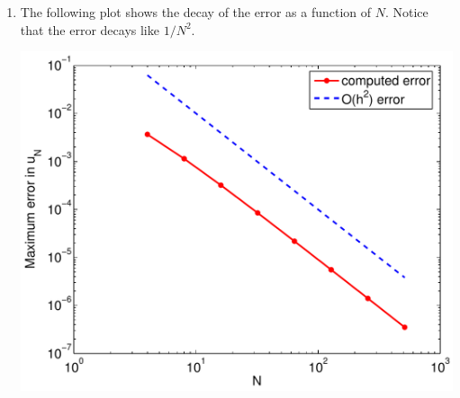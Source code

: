 {\begin{solution}
\begin{enumerate}
\item
The following plot shows the decay of the error as a function of $N$.
Notice that the error decays like $1/N^2$.
\begin{center} \includegraphics[scale=0.6]{femb}
\end{center}


\end{enumerate}
\end{solution}}{}

